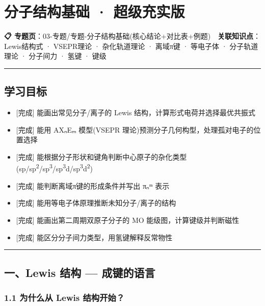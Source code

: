 \section{分子结构基础 · 超级充实版}\label{ux5206ux5b50ux7ed3ux6784ux57faux7840-ux8d85ux7ea7ux5145ux5b9eux7248}

\textbf{📋 专题页}：03-专题/专题-分子结构基础(核心结论+对比表+例题)
\textbf{🔗 关联知识点}：Lewis结构式 · VSEPR理论 · 杂化轨道理论 · 离域π键 · 等电子体 · 分子轨道理论 · 分子间力 · 氢键 · 键级

\begin{center}\rule{0.5\linewidth}{0.5pt}\end{center}

\subsection{学习目标}\label{ux5b66ux4e60ux76eeux6807}

\begin{itemize}
\tightlist
\item
  {[}完成{]} 能画出常见分子/离子的 Lewis 结构，计算形式电荷并选择最优共振式
\item
  {[}完成{]} 能用 AXₙEₘ 模型(VSEPR 理论)预测分子几何构型，处理孤对电子的位置选择
\item
  {[}完成{]} 能根据分子形状和键角判断中心原子的杂化类型(sp/sp\textsuperscript{2}/sp\textsuperscript{3}/sp\textsuperscript{3}d/sp\textsuperscript{3}d\textsuperscript{2})
\item
  {[}完成{]} 能判断离域π键的形成条件并写出 πₙᵐ 表示
\item
  {[}完成{]} 能用等电子体原理推断未知分子/离子的结构
\item
  {[}完成{]} 能画出第二周期双原子分子的 MO 能级图，计算键级并判断磁性
\item
  {[}完成{]} 能区分分子间力类型，用氢键解释反常物性
\end{itemize}

\begin{center}\rule{0.5\linewidth}{0.5pt}\end{center}

\subsection{一、Lewis 结构 --- 成键的语言}\label{ux4e00lewis-ux7ed3ux6784-ux6210ux952eux7684ux8bedux8a00}

\subsubsection{1.1 为什么从 Lewis 结构开始？}\label{ux4e3aux4ec0ux4e48ux4ece-lewis-ux7ed3ux6784ux5f00ux59cb}


